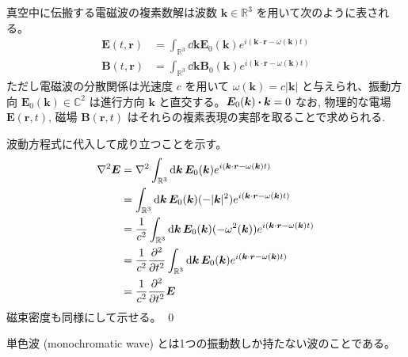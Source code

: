 \documentclass[uplatex,dvipdfmx,a4paper,11pt]{jlreq}
\makeatletter
\newcommand{\CC}{\mathbb{C}}
\newcommand{\RR}{\mathbb{R}}
\newcommand{\EE}{\bm{E}}
\newcommand{\BB}{\bm{B}}
\newcommand{\rr}{\bm{r}}
\newcommand{\kk}{\bm{k}}
\theoremstyle{definition}
\renewenvironment{proof}[1][\proofname]{\par
  \normalfont
  \topsep6\p@\@plus6\p@ \trivlist
  \item[\hskip\labelsep{\bfseries #1}\@addpunct{\bfseries}]\ignorespaces\quad\par
}{%
  \qed\endtrivlist\@endpefalse
}
\renewcommand\proofname{証明}
\makeatother
\begin{document}
\begin{theorem}[]
  真空中に伝搬する電磁波の複素数解は波数 $\kk\in\RR^3$ を用いて次のように表される。
  \begin{align}
    \EE(t, \rr) & = \int_{\RR^3}\dd{\kk}\EE_0(\kk)e^{i(\kk\cdot\rr - \omega(\kk)t)} \\
    \BB(t, \rr) & = \int_{\RR^3}\dd{\kk}\BB_0(\kk)e^{i(\kk\cdot\rr - \omega(\kk)t)}
  \end{align}
  ただし電磁波の分散関係は光速度 $c$ を用いて $\omega(\kk) = c|\kk|$ と与えられ、振動方向 $\EE_0(\kk)\in\CC^2$ は進行方向 $\kk$ と直交する。$\EE_0(\kk)\vdot\kk = 0$
  なお, 物理的な電場 $\EE(\rr, t)$, 磁場 $\BB(\rr, t)$ はそれらの複素表現の実部を取ることで求められる.
\end{theorem}
\begin{proof}
  波動方程式に代入して成り立つことを示す。
  \begin{align}
    \nabla^2\EE & = \nabla^2\int_{\RR^3}\dd{\kk}\EE_0(\kk)e^{i(\kk\cdot\rr - \omega(\kk)t)}                      \\
                & = \int_{\RR^3}\dd{\kk}\EE_0(\kk)(-|\kk|^2)e^{i(\kk\cdot\rr - \omega(\kk)t)}                    \\
                & = \frac{1}{c^2}\int_{\RR^3}\dd{\kk}\EE_0(\kk)(-\omega^2(\kk))e^{i(\kk\cdot\rr - \omega(\kk)t)} \\
                & = \frac{1}{c^2}\pdv[2]{t}\int_{\RR^3}\dd{\kk}\EE_0(\kk)e^{i(\kk\cdot\rr - \omega(\kk)t)}       \\
                & = \frac{1}{c^2}\pdv[2]{t}\EE
  \end{align}
  磁束密度も同様にして示せる。
\end{proof}

\begin{definition}[単色波]
  単色波 (monochromatic wave) とは1つの振動数しか持たない波のことである。
\end{definition}
\end{document}
